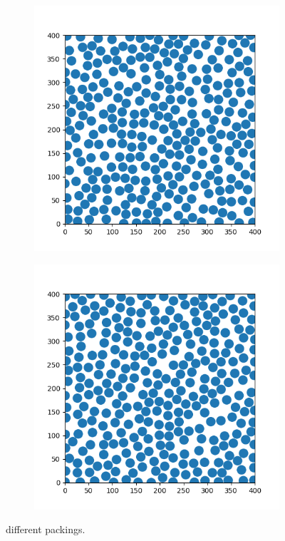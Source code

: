 \documentclass{article}
\begin{document}
\begin{figure}[h]
	\centering
	\begin{subfigure}[t]{0.38\linewidth}
		\centering
		\includegraphics[width = 1.0\linewidth, trim={0 0 0 0}, clip=true]{plot_seq294.png}
		\label{fig:prot}	
	\end{subfigure}
	\hspace{0.06\linewidth}
	\begin{subfigure}[t]{0.38\linewidth}
		\centering
		\includegraphics[width = 1.0\linewidth, trim={0 0 0 0}, clip=true]{plot_bd302.png}
		\label{fig:domains}	
	\end{subfigure}
\label{fig:4elj}
\caption{different packings.}
\end{figure}
\end{document}
